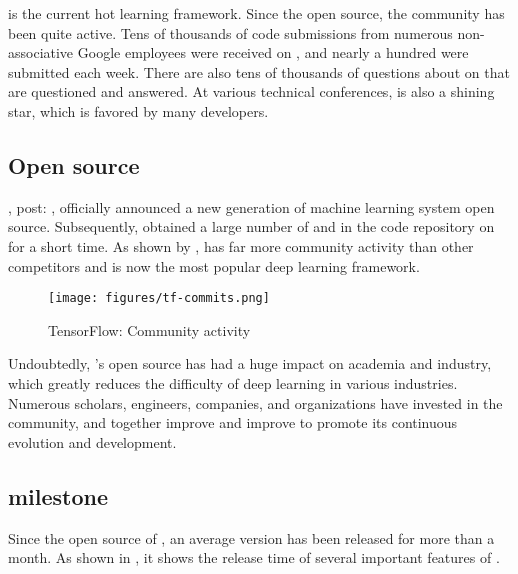\begin{content}

\tf{} is the current hot learning framework. Since the open source, the \tf{} community has been quite active. Tens of thousands of code submissions from numerous non-associative {Google} employees were received on , and nearly a hundred  were submitted each week. There are also tens of thousands of questions about \tf{} on  that are questioned and answered. At various technical conferences, \tf{} is also a shining star, which is favored by many developers.

\subsection{Open source}

,  post: , officially announced a new generation of machine learning system  open source. Subsequently,  obtained a large number of  and  in the code repository on  for a short time. As shown by ,  has far more community activity than other competitors and is now the most popular deep learning framework.

\begin{figure}[H]
\centering
\texttt{[image: figures/tf-commits.png]}
\caption{TensorFlow: Community activity}
 \label{fig:tf-commits}
\end{figure}

Undoubtedly, 's open source has had a huge impact on academia and industry, which greatly reduces the difficulty of deep learning in various industries. Numerous scholars, engineers, companies, and organizations have invested in the  community, and together improve and improve  to promote its continuous evolution and development.

\subsection{milestone}

\tf{} Since the open source of , an average version has been released for more than a month. As shown in , it shows the release time of several important features of \tf{}.


\end{content}
